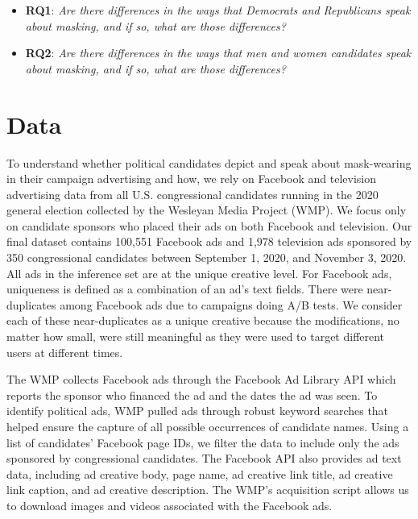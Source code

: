\begin{itemize}
    \item[]
        \textbf{RQ1}: \textit{Are there differences in the ways that Democrats and Republicans speak about masking, and if so, what are those differences?}\\
    \item[]
        \textbf{RQ2}: \textit{Are there differences in the ways that men and women candidates speak about masking, and if so, what are those differences?}
 \end{itemize}


\section*{Data}

To understand whether political candidates depict and speak about mask-wearing in their campaign advertising and how, we rely on Facebook and television advertising data from all U.S. congressional candidates running in the 2020 general election collected by the Wesleyan Media Project (WMP). We focus only on candidate sponsors who placed their ads on both Facebook and television. Our final dataset contains 100,551 Facebook ads and 1,978 television ads sponsored by 350 congressional candidates between September 1, 2020, and November 3, 2020. All ads in the inference set are at the unique creative level.  For Facebook ads, uniqueness is defined as a combination of an ad's text fields. There were near-duplicates among Facebook ads due to campaigns doing A/B tests. We consider each of these near-duplicates as a unique creative because the modifications, no matter how small, were still meaningful as they were used to target different users at different times.

The WMP collects Facebook ads through the Facebook Ad Library API which reports the sponsor who financed the ad and the dates the ad was seen. To identify political ads, WMP pulled ads through robust keyword searches that helped ensure the capture of all possible occurrences of candidate names. Using a list of candidates' Facebook page IDs, we filter the data to include only the ads sponsored by congressional candidates. The Facebook API also provides ad text data, including ad creative body, page name, ad creative link title, ad creative link caption, and ad creative description. The WMP's acquisition script allows us to download images and videos associated with the Facebook ads.

